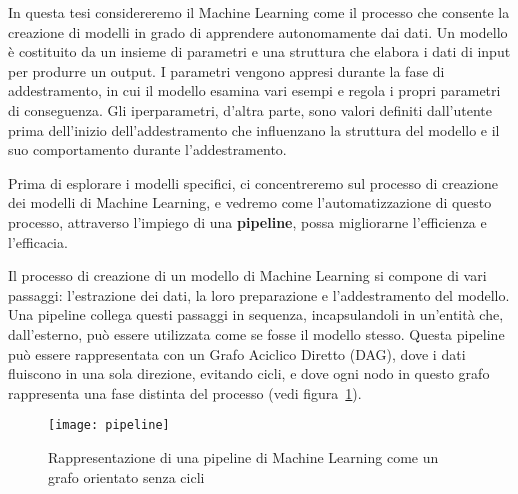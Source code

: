 \label{chap:machine_learning}

In questa tesi considereremo il Machine Learning come il processo che consente
la creazione di modelli in grado di apprendere autonomamente dai dati. Un
modello è costituito da un insieme di parametri e una struttura che elabora i
dati di input per produrre un output. I parametri vengono appresi durante la
fase di addestramento, in cui il modello esamina vari esempi e regola i propri
parametri di conseguenza. Gli iperparametri, d'altra parte, sono valori
definiti dall'utente prima dell'inizio dell'addestramento che influenzano la
struttura del modello e il suo comportamento durante l'addestramento.

Prima di esplorare i modelli specifici, ci concentreremo sul processo di
creazione dei modelli di Machine Learning, e vedremo come l'automatizzazione
di questo processo, attraverso l'impiego di una \textbf{pipeline}, possa
migliorarne l'efficienza e l'efficacia.

Il processo di creazione di un modello di Machine Learning si compone di vari
passaggi: l'estrazione dei dati, la loro preparazione e l'addestramento del
modello. Una pipeline collega questi passaggi in sequenza, incapsulandoli in
un'entità che, dall'esterno, può essere utilizzata come se fosse il modello
stesso. Questa pipeline può essere rappresentata con un Grafo Aciclico Diretto
(DAG), dove i dati fluiscono in una sola direzione, evitando cicli, e dove
ogni nodo in questo grafo rappresenta una fase distinta del processo (vedi
figura~\ref{fig:ml_pipeline_dag}).

\begin{figure}[!ht]
    \centering
    \texttt{[image: pipeline]}
    \caption{Rappresentazione di una pipeline di Machine Learning come un
    grafo orientato senza cicli}
    \label{fig:ml_pipeline_dag}
\end{figure}

